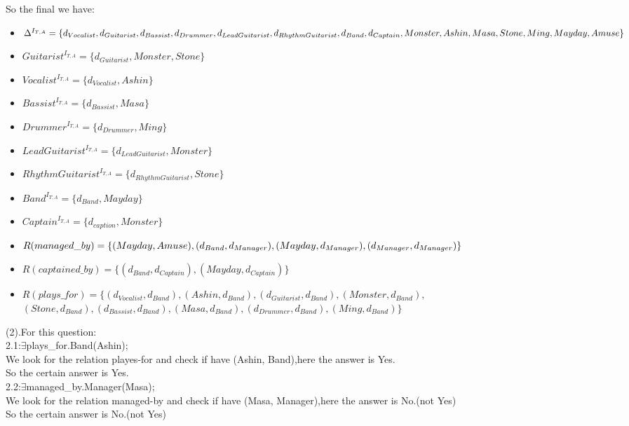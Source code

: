 \documentclass{article}
\begin{document}
    So the final we have:\\
    \begin{itemize}
        \item $\Delta^{I_{T,A}} = \{d_{Vocalist}, d_{Guitarist}, d_{Bassist}, d_{Drummer}, d_{LeadGuitarist}, d_{RhythmGuitarist}, d_{Band}, \\
        d_{Captain},Monster, Ashin, Masa, Stone, Ming, Mayday, Amuse\}$
        \item $Guitarist^{I_{T,A}} = \{d_{Guitarist}, Monster, Stone\}$
        \item $Vocalist^{I_{T,A}} = \{d_{Vocalist}, Ashin\}$
        \item $Bassist^{I_{T,A}} = \{d_{Bassist}, Masa\}$
        \item $Drummer^{I_{T,A}} = \{d_{Drummer}, Ming\}$
        \item $LeadGuitarist^{I_{T,A}} = \{d_{LeadGuitarist}, Monster\}$
        \item $RhythmGuitarist^{I_{T,A}} = \{d_{RhythmGuitarist}, Stone\}$
        \item $Band^{I_{T,A}} = \{d_{Band}, Mayday\}$
        \item $Captain^{I_{T,A}} = \{d_{caption}, Monster\}$
        \item $R(managed\_by) = \{(Mayday, Amuse), (d_{Band}, d_{Manager}), (Mayday, d_{Manager}),\\
         (d_{Manager}, d_{Manager})\}$
        \item $R(captained\_by) = \{(d_{Band}, d_{Captain}), (Mayday, d_{Captain})\}$
        \item $R(plays\_for) = \{(d_{Vocalist}, d_{Band}), (Ashin, d_{Band}), (d_{Guitarist}, d_{Band}), (Monster, d_{Band}),$
            $(Stone, d_{Band}), (d_{Bassist}, d_{Band}), (Masa, d_{Band}), (d_{Drummer}, d_{Band}), (Ming, d_{Band})\}$ 
    \end{itemize}

    (2).For this question:\\
    2.1:{$\exists$plays\_for.Band(Ashin);}\\
    We look for the relation playes-for and check if have (Ashin, Band),here the answer is Yes.\\
    So the certain answer is Yes.\\

    2.2:{$\exists$managed\_by.Manager(Masa);}\\
    We look for the relation managed-by and check if have (Masa, Manager),here the answer is No.(not Yes)\\
    So the certain answer is No.(not Yes)\\
\end{document}
